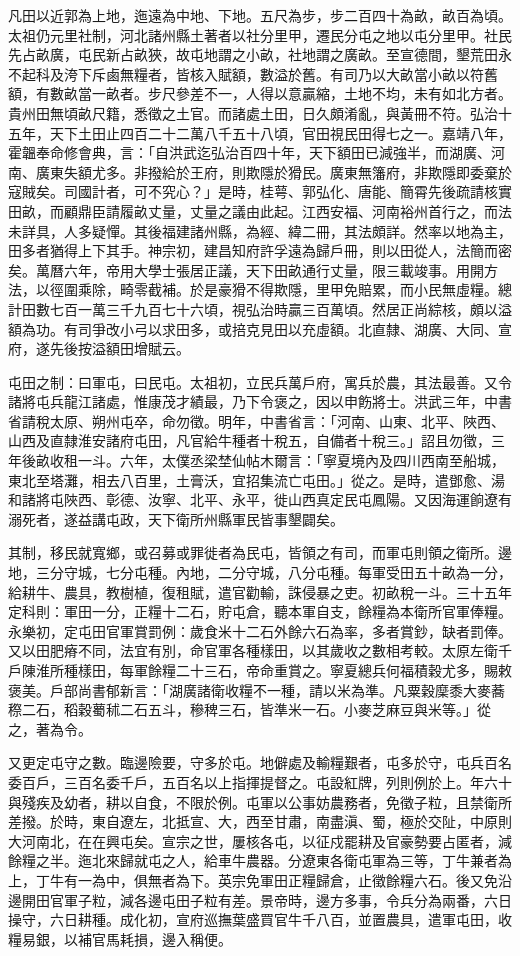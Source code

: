 凡田以近郭為上地，迤遠為中地、下地。五尺為步，步二百四十為畝，畝百為頃。太祖仍元里社制，河北諸州縣土著者以社分里甲，遷民分屯之地以屯分里甲。社民先占畝廣，屯民新占畝狹，故屯地謂之小畝，社地謂之廣畝。至宣德間，墾荒田永不起科及洿下斥鹵無糧者，皆核入賦額，數溢於舊。有司乃以大畝當小畝以符舊額，有數畝當一畝者。步尺參差不一，人得以意贏縮，土地不均，未有如北方者。貴州田無頃畝尺籍，悉徵之土官。而諸處土田，日久頗淆亂，與黃冊不符。弘治十五年，天下土田止四百二十二萬八千五十八頃，官田視民田得七之一。嘉靖八年，霍韞奉命修會典，言：「自洪武迄弘治百四十年，天下額田已減強半，而湖廣、河南、廣東失額尤多。非撥給於王府，則欺隱於猾民。廣東無籓府，非欺隱即委棄於寇賊矣。司國計者，可不究心？」是時，桂萼、郭弘化、唐能、簡霄先後疏請核實田畝，而顧鼎臣請履畝丈量，丈量之議由此起。江西安福、河南裕州首行之，而法未詳具，人多疑憚。其後福建諸州縣，為經、緯二冊，其法頗詳。然率以地為主，田多者猶得上下其手。神宗初，建昌知府許孚遠為歸戶冊，則以田從人，法簡而密矣。萬曆六年，帝用大學士張居正議，天下田畝通行丈量，限三載竣事。用開方法，以徑圍乘除，畸零截補。於是豪猾不得欺隱，里甲免賠累，而小民無虛糧。總計田數七百一萬三千九百七十六頃，視弘治時贏三百萬頃。然居正尚綜核，頗以溢額為功。有司爭改小弓以求田多，或掊克見田以充虛額。北直隸、湖廣、大同、宣府，遂先後按溢額田增賦云。

屯田之制：曰軍屯，曰民屯。太祖初，立民兵萬戶府，寓兵於農，其法最善。又令諸將屯兵龍江諸處，惟康茂才績最，乃下令褒之，因以申飭將士。洪武三年，中書省請稅太原、朔州屯卒，命勿徵。明年，中書省言：「河南、山東、北平、陜西、山西及直隸淮安諸府屯田，凡官給牛種者十稅五，自備者十稅三。」詔且勿徵，三年後畝收租一斗。六年，太僕丞梁埜仙帖木爾言：「寧夏境內及四川西南至船城，東北至塔灘，相去八百里，土膏沃，宜招集流亡屯田。」從之。是時，遣鄧愈、湯和諸將屯陜西、彰德、汝寧、北平、永平，徙山西真定民屯鳳陽。又因海運餉遼有溺死者，遂益講屯政，天下衛所州縣軍民皆事墾闢矣。

其制，移民就寬鄉，或召募或罪徙者為民屯，皆領之有司，而軍屯則領之衛所。邊地，三分守城，七分屯種。內地，二分守城，八分屯種。每軍受田五十畝為一分，給耕牛、農具，教樹植，復租賦，遣官勸輸，誅侵暴之吏。初畝稅一斗。三十五年定科則：軍田一分，正糧十二石，貯屯倉，聽本軍自支，餘糧為本衛所官軍俸糧。永樂初，定屯田官軍賞罰例：歲食米十二石外餘六石為率，多者賞鈔，缺者罰俸。又以田肥瘠不同，法宜有別，命官軍各種樣田，以其歲收之數相考較。太原左衛千戶陳淮所種樣田，每軍餘糧二十三石，帝命重賞之。寧夏總兵何福積穀尤多，賜敕褒美。戶部尚書郁新言：「湖廣諸衛收糧不一種，請以米為準。凡粟穀穈黍大麥蕎穄二石，稻穀薥秫二石五斗，穇稗三石，皆準米一石。小麥芝麻豆與米等。」從之，著為令。

又更定屯守之數。臨邊險要，守多於屯。地僻處及輸糧艱者，屯多於守，屯兵百名委百戶，三百名委千戶，五百名以上指揮提督之。屯設紅牌，列則例於上。年六十與殘疾及幼者，耕以自食，不限於例。屯軍以公事妨農務者，免徵子粒，且禁衛所差撥。於時，東自遼左，北抵宣、大，西至甘肅，南盡滇、蜀，極於交阯，中原則大河南北，在在興屯矣。宣宗之世，屢核各屯，以征戍罷耕及官豪勢要占匿者，減餘糧之半。迤北來歸就屯之人，給車牛農器。分遼東各衛屯軍為三等，丁牛兼者為上，丁牛有一為中，俱無者為下。英宗免軍田正糧歸倉，止徵餘糧六石。後又免沿邊開田官軍子粒，減各邊屯田子粒有差。景帝時，邊方多事，令兵分為兩番，六日操守，六日耕種。成化初，宣府巡撫葉盛買官牛千八百，並置農具，遣軍屯田，收糧易銀，以補官馬耗損，邊入稱便。

